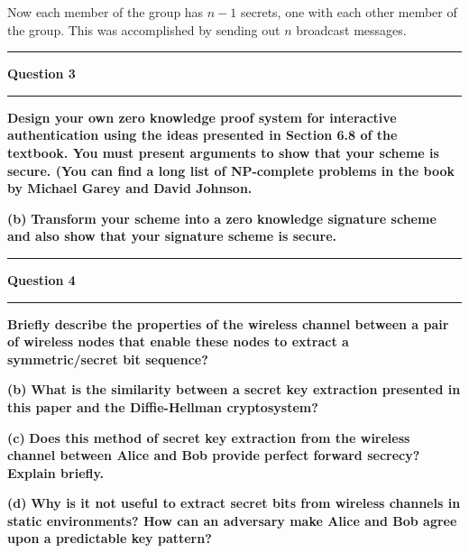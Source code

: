 \documentclass[11pt]{article}
\newcommand\question[2]{\vspace{.25in}\hrule\textbf{#1}\vspace{.5em}\hrule\vspace{.10in}}
\renewcommand\part[1]{\vspace{.10in}\textbf{(#1)}}
\begin{document}
Now each member of the group has $n - 1$ secrets, one with each other member of the group. This was accomplished by sending out $n$ broadcast messages.

\question{Question 3}

\part{a} \textbf{Design your own zero knowledge proof system for interactive authentication using the ideas presented in Section 6.8 of the textbook. You must present arguments to show that your scheme is secure. (You can find a long list of NP-complete problems in the book by Michael Garey and David Johnson.}

\part{b} \textbf{Transform your scheme into a zero knowledge signature scheme and also show that your signature scheme is secure.}

\question{Question 4}

\part{a} \textbf{Briefly describe the properties of the wireless channel between a pair of wireless nodes that enable these nodes to extract a symmetric/secret bit sequence?}

\part{b} \textbf{What is the similarity between a secret key extraction presented in this paper and the Diffie-Hellman cryptosystem?}

\part{c} \textbf{Does this method of secret key extraction from the wireless channel between Alice and Bob provide perfect forward secrecy? Explain briefly.}

\part{d} \textbf{Why is it not useful to extract secret bits from wireless channels in static environments? How can an adversary make Alice and Bob agree upon a predictable key pattern?}
\end{document}
